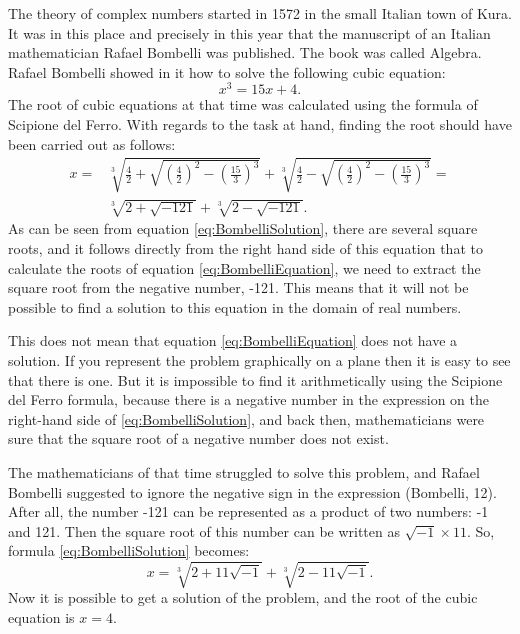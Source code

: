 \documentclass[
]{book}
\begin{document}
The theory of complex numbers started in 1572 in the small Italian town of Kura. It was in this place and precisely in this year that the manuscript of an Italian mathematician Rafael Bombelli was published. The book was called Algebra. Rafael Bombelli showed in it how to solve the following cubic equation:
\begin{equation}
    x^3 = 15x + 4 .
    \label{eq:BombelliEquation}
\end{equation}
The root of cubic equations at that time was calculated using the formula of Scipione del Ferro. With regards to the task at hand, finding the root should have been carried out as follows:
\begin{equation}
    \begin{aligned}
    x = & \sqrt[3]{\frac{4}{2}+\sqrt{\left(\frac{4}{2}\right)^2 - \left(\frac{15}{3}\right)^3}} + \sqrt[3]{\frac{4}{2}-\sqrt{\left(\frac{4}{2}\right)^2 - \left(\frac{15}{3}\right)^3}} = \\
        & \sqrt[3]{2+\sqrt{-121}} + \sqrt[3]{2-\sqrt{-121}} .
    \end{aligned}
    \label{eq:BombelliSolution}
\end{equation}
As can be seen from equation \eqref{eq:BombelliSolution}, there are several square roots, and it follows directly from the right hand side of this equation that to calculate the roots of equation \eqref{eq:BombelliEquation}, we need to extract the square root from the negative number, -121. This means that it will not be possible to find a solution to this equation in the domain of real numbers.

This does not mean that equation \eqref{eq:BombelliEquation} does not have a solution. If you represent the problem graphically on a plane then it is easy to see that there is one. But it is impossible to find it arithmetically using the Scipione del Ferro formula, because there is a negative number in the expression on the right-hand side of \eqref{eq:BombelliSolution}, and back then, mathematicians were sure that the square root of a negative number does not exist.

The mathematicians of that time struggled to solve this problem, and Rafael Bombelli suggested to ignore the negative sign in the expression (Bombelli, 12). After all, the number -121 can be represented as a product of two numbers: -1 and 121. Then the square root of this number can be written as \(\sqrt{-1} \times 11\). So, formula \eqref{eq:BombelliSolution} becomes:
\begin{equation}
    x = \sqrt[3]{2+11\sqrt{-1}} + \sqrt[3]{2-11\sqrt{-1}} .
    \label{eq:BombelliSolutionSqrt}
\end{equation}
Now it is possible to get a solution of the problem, and the root of the cubic equation is \(x = 4\).
\end{document}
